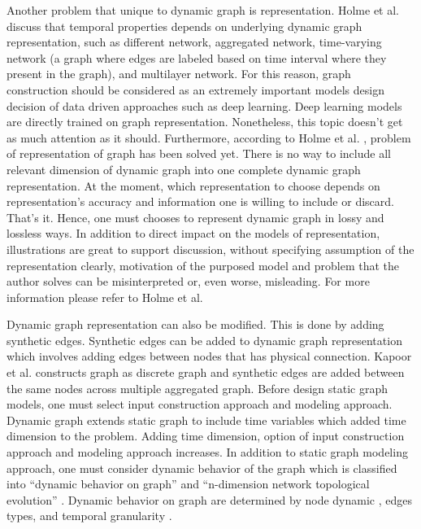 \documentclass{IEEEtran}
\begin{document}
Another problem that unique to dynamic graph is representation. Holme et al. \cite{holme2012temporal} discuss that temporal properties depends on underlying dynamic graph representation, such as different network, aggregated network, time-varying network (a graph where edges are labeled based on time interval where they present in the graph), and multilayer network. For this reason, graph construction should be considered as an extremely important models design decision of data driven approaches such as deep learning. Deep learning models are directly trained on graph representation. Nonetheless, this topic doesn't get as much attention as it should. Furthermore, according to Holme et al. \cite{holme2015modern}, problem of representation of graph has been solved yet. There is no way to include all relevant dimension of dynamic graph into one complete dynamic graph representation. At the moment, which representation to choose depends on representation's accuracy and information one is willing to include or discard. That's it. Hence, one must chooses to represent dynamic graph in lossy and lossless ways. In addition to direct impact on the models of representation, illustrations are great to support discussion, without specifying assumption of the representation clearly, motivation of the purposed model and problem that the author solves can be misinterpreted or, even worse, misleading. For more information please refer to Holme et al. \cite{holme2015modern}

Dynamic graph representation can also be modified. This is done by adding synthetic edges. Synthetic edges can be added to dynamic graph representation which involves adding edges between nodes that has physical connection. Kapoor et al. \cite{kapoor2020examining} constructs graph as discrete graph and synthetic edges are added between the same nodes across multiple aggregated graph.
Before design static graph models, one must select input construction approach and modeling approach. Dynamic graph extends static graph to include time variables which added time dimension to the problem. Adding time dimension, option of input construction approach and modeling approach increases.
In addition to static graph modeling approach, one must consider dynamic behavior of the graph which is classified into ``dynamic behavior on graph'' and ``n-dimension network topological evolution'' \cite{holme2015modern,barrosSurveyEmbeddingDynamic2021}. Dynamic behavior on graph are determined by node dynamic \cite{skardingFoundationsModelingDynamic2021}, edges types, and temporal granularity \cite{skardingFoundationsModelingDynamic2021}.
\end{document}
